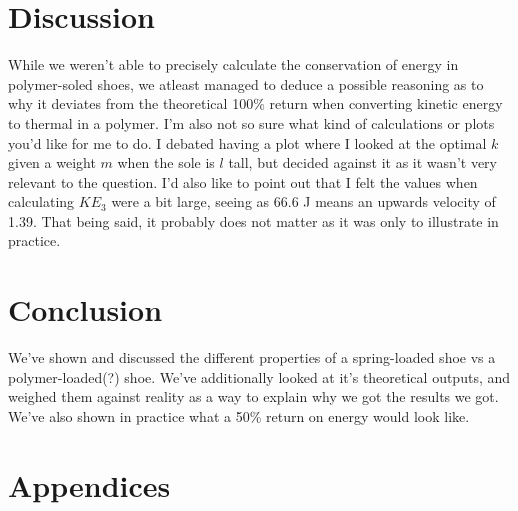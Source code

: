 \documentclass{article}
\begin{document}
\section{Discussion}
While we weren't able to precisely calculate the conservation of energy in polymer-soled shoes, we atleast managed to deduce a possible reasoning as to why it deviates from the theoretical 100\% return when converting kinetic energy to thermal in a polymer.
\newline
I'm also not so sure what kind of calculations or plots you'd like for me to do. I debated having a plot where I looked at the optimal $k$ given a weight $m$ when the sole is $l$ tall, but decided against it as it wasn't very relevant to the question. \newline
I'd also like to point out that I felt the values when calculating $KE_3$ were a bit large, seeing as 66.6 J means an upwards velocity of 1.39. That being said, it probably does not matter as it was only to illustrate in practice.
\section{Conclusion}
We've shown and discussed the different properties of a spring-loaded shoe vs a polymer-loaded(?) shoe. We've additionally looked at it's theoretical outputs, and weighed them against reality as a way to explain why we got the results we got. We've also shown in practice what a 50\% return on energy would look like.


\newpage
\section*{Appendices}
\end{document}
